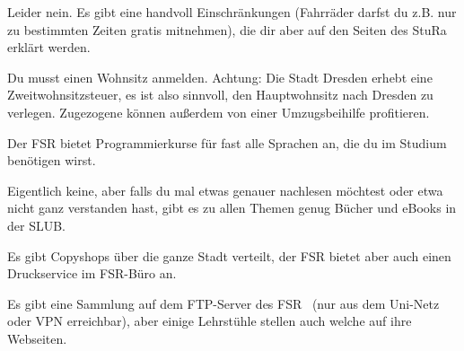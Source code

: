 Leider nein. Es gibt eine handvoll Einschränkungen (Fahrräder darfst du z.B. nur zu bestimmten Zeiten gratis mitnehmen), die dir aber auf den Seiten des StuRa~ erklärt werden.

Du musst einen Wohnsitz anmelden. Achtung: Die Stadt Dresden erhebt eine Zweitwohnsitzsteuer, es ist also sinnvoll, den Hauptwohnsitz nach Dresden zu verlegen. Zugezogene können außerdem von einer Umzugsbeihilfe profitieren.

Der FSR bietet Programmierkurse für fast alle Sprachen an, die du im Studium benötigen wirst. 

\label{minisec:faq}

Eigentlich keine, aber falls du mal etwas genauer nachlesen möchtest oder etwa nicht ganz verstanden hast, gibt es zu allen Themen genug Bücher und eBooks in der SLUB.~

Es gibt Copyshops über die ganze Stadt verteilt, der FSR bietet aber auch einen Druckservice im FSR-Büro an.

Es gibt eine Sammlung auf dem FTP-Server des FSR~ (nur aus dem Uni-Netz oder VPN erreichbar), aber einige Lehrstühle stellen auch welche auf ihre Webseiten.
